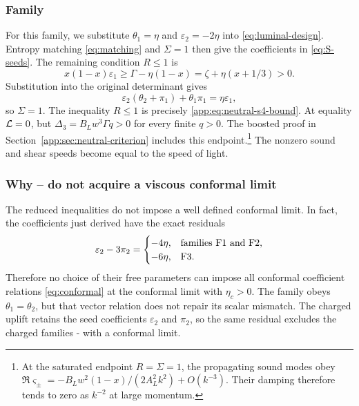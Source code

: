 \subsubsection*{Family }
\label{app:family:S4}
For this family, we substitute $\theta_1=\eta$ and $\varepsilon_2=-2\eta$ into
\eqref{eq:luminal-design}. Entropy matching \eqref{eq:matching} and $\Sigma=1$ then give
the  coefficients in \eqref{eq:S-seeds}. The remaining condition
$R\leq1$ is
\begin{equation}\label{app:eq:neutral-s4-bound}
 x(1-x)\varepsilon_1\geq\Gamma-\eta(1-x)
       =\zeta+\eta(x+1/3)>0.
\end{equation}
Substitution into the original determinant gives
\begin{equation}
 {\varepsilon_2}({\theta_2}+{\pi_1})+{\theta_1}{\pi_1}
       =\eta{\varepsilon_1},
\end{equation}
so $\Sigma=1$. The inequality $R\leq1$ is precisely
\eqref{app:eq:neutral-s4-bound}. At equality $\mathcal L=0$, but
$\Delta_3=B_Lw^3\Gamma q>0$ for every finite $q>0$.
The boosted proof in Section~\ref{app:sec:neutral-criterion} includes this
endpoint.\footnote{\label{fn:F3-large-k-damping}At the saturated endpoint
$R=\Sigma=1$, the propagating sound modes obey
$\Re\varsigma_\pm=-B_Lw^2(1-x)/(2A_L^2k^2)+O(k^{-3})$.
Their damping therefore tends to zero as $k^{-2}$ at large momentum.}
The nonzero sound and shear speeds become equal to the speed of light.


\subsubsection*{Why -- do not acquire a viscous conformal limit}
\label{app:sec:numbered-conformal-restriction}
The reduced inequalities do not impose a well defined conformal limit. In fact, the
coefficients just derived have the exact residuals
\begin{equation}\label{app:eq:numbered-conformal-residuals}
 \varepsilon_2-3\pi_2=
 \begin{cases}
 -4\eta,&\text{families F1 and F2},\\
 -6\eta,&\text{F3}.
 \end{cases}
\end{equation}
Therefore no choice of their free parameters can impose all conformal
coefficient relations \eqref{eq:conformal} at the conformal limit with $\eta_c>0$.
The family  obeys $\theta_1=\theta_2$, but that vector relation does not repair its
scalar mismatch. The charged uplift retains the seed coefficients
$\varepsilon_2$ and $\pi_2$, so the same residual excludes the charged families -
with a conformal limit.


